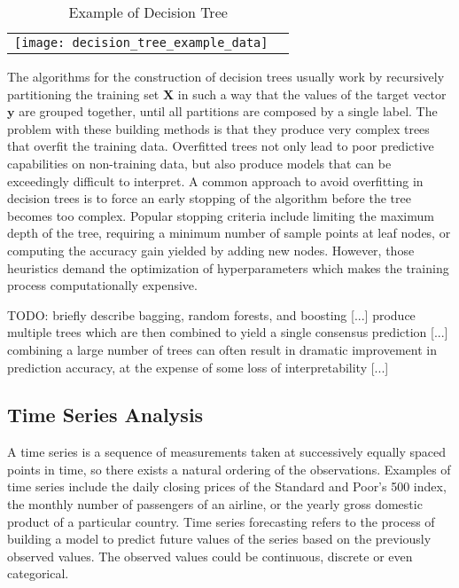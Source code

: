 \begin{table}
    \begin{center}

        \begin{tabular}{ c c }

            \texttt{[image: decision\_tree\_example\_data]} & \raisebox{.4\height}{\texttt{[image: decision\_tree\_example]}}
        \end{tabular}
    \end{center}
    \caption{\label{tab:DecisionTreeExample}Example of Decision Tree}
\end{table}

The algorithms for the construction of decision trees usually work by recursively partitioning the training set $\mathbf{X}$ in such a way that the values of the target vector $\textbf{y}$ are grouped together, until all partitions are composed by a single label. The problem with these building methods is that they produce very complex trees that overfit the training data. Overfitted trees not only lead to poor predictive capabilities on non-training data, but also produce models that can be exceedingly difficult to interpret. A common approach to avoid overfitting in decision trees is to force an early stopping of the algorithm before the tree becomes too complex. Popular stopping criteria include limiting the maximum depth of the tree, requiring a minimum number of sample points at leaf nodes, or computing the accuracy gain yielded by adding new nodes. However, those heuristics demand the optimization of hyperparameters which makes the training process computationally expensive.

    {\color{red} TODO: briefly describe bagging, random forests, and boosting [...] produce multiple trees which are then combined to yield a single consensus prediction [...] combining a large number of trees can often result in dramatic improvement in prediction accuracy, at the expense of some loss of interpretability [...]}


\subsection{Time Series Analysis}
\label{sec:intro_time_series}

A time series is a sequence of measurements taken at successively equally spaced points in time, so there exists a natural ordering of the observations. Examples of time series include the daily closing prices of the Standard and Poor's 500 index, the monthly number of passengers of an airline, or the yearly gross domestic product of a particular country. Time series forecasting refers to the process of building a model to predict future values of the series based on the previously observed values. The observed values could be continuous, discrete or even categorical.

